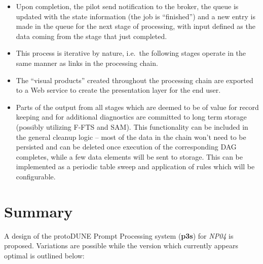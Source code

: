 \documentclass[pdftex,12pt,letter]{article}
\newcommand{\pd}{protoDUNE\xspace}
\newcommand{\expname}{\textit{NP04}\xspace}
\newcommand{\PPS}{\textbf{p3s}\xspace}
\begin{document}
\begin{itemize}
\item Upon completion, the pilot send notification to the broker, the queue is updated with the state information (the job is ``finished'') and
a new entry is made in the queue for the next stage of processing, with input defined as the data coming from the stage that just completed.

\item This process is iterative by nature, i.e.~the following stages operate in the same manner as links in the processing chain.

\item The ``visual products'' created throughout the processing chain are exported to a Web service to create the presentation
layer for the end user.

\item Parts of the output from all stages which are deemed to be of value for record keeping and for additional
diagnostics are committed to long term storage (possibly utilizing F-FTS and SAM). This functionality can be included
in the general cleanup logic -- most of the data in the chain won't need to be persisted and can be deleted once
execution of the corresponding DAG completes, while a few data elements will be sent to storage. This can be
implemented as a periodic table sweep and application of rules which will be configurable.

\end{itemize}

\section{Summary}
A design of the \pd Prompt Processing system (\PPS) for \expname is proposed. Variations are possible
while the version which currently appears optimal is outlined below:
\end{document}
